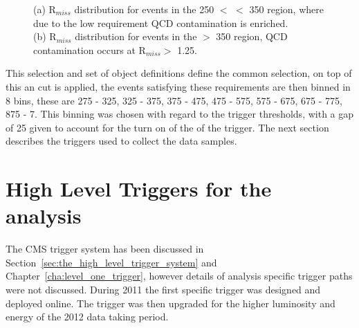 \begin{figure}[htbp]
  \centering
\caption{(a) R$_{miss}$ distribution for events in the \unit{250}{\GeV} 
$<$ \HT $<$ \unit{350}{\GeV} region, where due to the low \HT requirement QCD 
contamination is enriched. \\ (b) R$_{miss}$ distribution for events in the 
\HT $>$ \unit{350}{\GeV} region, QCD contamination occurs at R$_{miss} >$ 1.25.}
\label{fig:MHTovMET_lowHT_highHT}
\end{figure}


This selection and set of object definitions define the common selection, on 
top of this an \alt cut is applied, the events satisfying these requirements 
are then binned in 8 \HT bins, these are \unit{275}{\GeV} - \unit{325}{\GeV}, 
\unit{325}{\GeV} - \unit{375}{\GeV}, \unit{375}{\GeV} - \unit{475}{\GeV}, 
\unit{475}{\GeV} - \unit{575}{\GeV}, \unit{575}{\GeV} - \unit{675}{\GeV}, 
\unit{675}{\GeV} - \unit{775}{\GeV}, \unit{875}{\GeV} - \unit{7}{\TeV}. This binning was chosen with regard to the \HT trigger thresholds, with a gap of \unit{25}{\GeV} given to account for the turn on of the \HT of the trigger.
The next section describes the triggers used to collect the data samples.

\section{High Level Triggers for the \alt analysis} %
\label{sec:high_level_triggers_for_the_alt_analysis}
The CMS trigger system has been discussed in 
Section~\ref{sec:the_high_level_trigger_system} and 
Chapter~\ref{cha:level_one_trigger}, however details of analysis specific 
trigger paths were not discussed. During 2011 the first \alt specific trigger 
was designed and deployed online. The trigger was then upgraded for the higher 
luminosity and energy of the 2012 data taking period.


